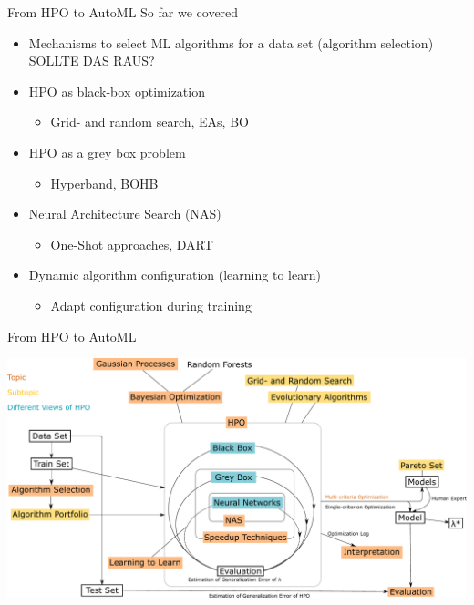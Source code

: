 

\usepackage[normalem]{ulem}
\usepackage{pifont}

\subtitle{Wrap Up}




\maketitle



\begin{frame}{From HPO to AutoML}
  So far we covered
  \begin{itemize}
    \item Mechanisms to select ML algorithms for a data set (algorithm selection)
        SOLLTE DAS RAUS?
    \item HPO as black-box optimization
    \begin{itemize}
      \item Grid- and random search, EAs, BO
    \end{itemize}
    \item HPO as a grey box problem
    \begin{itemize}
      \item Hyperband, BOHB
    \end{itemize}
    \item Neural Architecture Search (NAS)
    \begin{itemize}
      \item One-Shot approaches, DART
    \end{itemize}
    \item Dynamic algorithm configuration (learning to learn)
    \begin{itemize}
      \item Adapt configuration during training
    \end{itemize}
  \end{itemize}  
\end{frame}

\begin{frame}{From HPO to AutoML}
    \begin{center}
      \includegraphics[width = 0.9\linewidth]{images/drawing.pdf}  
    \end{center}
\end{frame}

